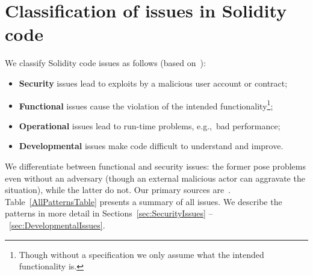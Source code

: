 \section {Classification of issues in Solidity code}

We classify Solidity code issues as follows (based on~\cite{Henney2003}):
\begin{itemize}
	\item \textbf{Security} issues lead to exploits by a malicious user account or contract;
	\item \textbf{Functional} issues cause the violation of the intended functionality\footnote{Though without a specification we only assume what the intended functionality is.};
	\item \textbf{Operational} issues lead to run-time problems, e.g.,~bad performance;
	\item \textbf{Developmental} issues make code difficult to understand and improve.
\end{itemize}
We differentiate between functional and security issues: the former pose problems even without an adversary (though an external malicious actor can aggravate the situation), while the latter do not. Our primary sources are~\cite{Consensys2016, Solidity2017, Atzei2017, Delmolino2016, Chen2017, OpenZeppelin2017a}.
Table~\ref{AllPatternsTable} presents a summary of all issues.
We describe the patterns in more detail in Sections~\ref{sec:SecurityIssues} --~\ref{sec:DevelopmentalIssues}.


